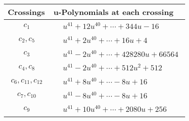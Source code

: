 \documentclass[1p]{elsarticle_modified}
\theoremstyle{definition}
\begin{document}
\begin{tabular}{m{50pt}|m{274pt}}
Crossings & \hspace{64pt}u-Polynomials at each crossing \\
\hline $$\begin{aligned}c_{1}\end{aligned}$$&$\begin{aligned}
&u^{41}+12 u^{40}+\cdots+344 u-16
\end{aligned}$\\
\hline $$\begin{aligned}c_{2},c_{5}\end{aligned}$$&$\begin{aligned}
&u^{41}+2 u^{40}+\cdots+16 u+4
\end{aligned}$\\
\hline $$\begin{aligned}c_{3}\end{aligned}$$&$\begin{aligned}
&u^{41}-2 u^{40}+\cdots+428280 u+66564
\end{aligned}$\\
\hline $$\begin{aligned}c_{4},c_{8}\end{aligned}$$&$\begin{aligned}
&u^{41}-2 u^{40}+\cdots+512 u^2+512
\end{aligned}$\\
\hline $$\begin{aligned}c_{6},c_{11},c_{12}\end{aligned}$$&$\begin{aligned}
&u^{41}+8 u^{40}+\cdots-8 u+16
\end{aligned}$\\
\hline $$\begin{aligned}c_{7},c_{10}\end{aligned}$$&$\begin{aligned}
&u^{41}-8 u^{40}+\cdots-8 u+16
\end{aligned}$\\
\hline $$\begin{aligned}c_{9}\end{aligned}$$&$\begin{aligned}
&u^{41}+10 u^{40}+\cdots+2080 u+256
\end{aligned}$\\
\hline
\end{tabular}\\~\\
\newpage\renewcommand{\arraystretch}{1}
\end{document}
